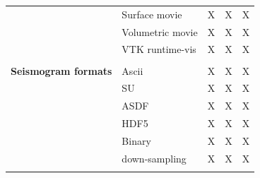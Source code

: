 \begin{table}[htp]
\begin{center}
\begin{tabular}{ l l c c c}
                    & Surface movie     & X  & X  & X \\
                    & Volumetric movie  & X  & X  & X \\
                    & VTK runtime-vis   & X  & X  & X \\
\hline
& & & & \\
{\bf Seismogram formats}  & Ascii          & X  & X  & X \\
                          & SU             & X  & X  & X \\
                          & ASDF           & X  & X  & X \\
                          & HDF5           & X  & X  & X \\
                          & Binary         & X  & X  & X \\
                          & down-sampling  & X  & X  & X \\
%
\hline
& & & & \\ %
\end{tabular}
\end{center}
\end{table}



